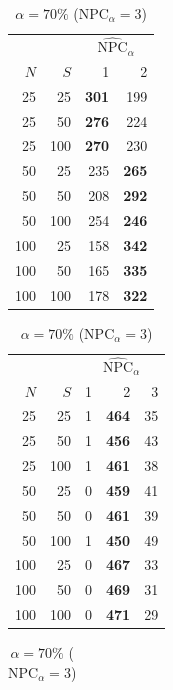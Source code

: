 \documentclass{article}
\newcounter{th}
\begin{document}
\begin{table}
\begin{subtable}[h]{0.3\textwidth}
\centering
\begin{tabular}{rr|rr}
    & & \multicolumn{2}{c}{$\widehat{\text{NPC}}_{\alpha}$} \\
    $N$ & $S$ & 1 & 2 \\
    \hline
    25 & 25 & \textbf{301} & 199 \\
    25 & 50 & \textbf{276} & 224 \\
    25 & 100 & \textbf{270} & 230 \\
    50 & 25 & 235 & \textbf{265} \\
    50 & 50 & 208 & \textbf{292} \\
    50 & 100 & 254 & \textbf{246} \\
    100 & 25 & 158 & \textbf{342} \\
    100 & 50 & 165 & \textbf{335} \\
    100 & 100 & 178 & \textbf{322} \\
\end{tabular}
\caption{$\alpha = 50\%$ ($\text{NPC}_{\alpha} = 2$)}
\end{subtable}
\hfill
\begin{subtable}[h]{0.3\textwidth}
\centering
\begin{tabular}{rr|rrr}
    & & \multicolumn{3}{c}{$\widehat{\text{NPC}}_{\alpha}$} \\
    $N$ & $S$ & 1 & 2 & 3\\
    \hline
    25 & 25 & 1 & \textbf{464} & 35\\
    25 & 50 & 1 & \textbf{456} & 43\\
    25 & 100 & 1 & \textbf{461} & 38\\
    50 & 25 & 0 & \textbf{459} & 41\\
    50 & 50 & 0 & \textbf{461} & 39\\
    50 & 100 & 1 & \textbf{450} & 49\\
    100 & 25 & 0 & \textbf{467} & 33\\
    100 & 50 & 0 & \textbf{469} & 31\\
    100 & 100 & 0 & \textbf{471} & 29\\
\end{tabular}
\caption{$\alpha = 70\%$ ($\text{NPC}_{\alpha} = 3$)}
\end{subtable}
\hfill
\begin{subtable}[h]{0.3\textwidth}
\centering
\begin{tabular}{rr|rrr}

\end{tabular}
\end{subtable}
\end{table}
\end{document}
